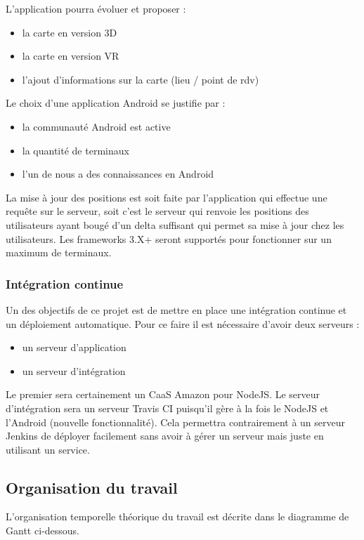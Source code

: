 L'application pourra évoluer et proposer :
\begin{itemize}
    \item la carte en version 3D
    \item la carte en version VR
    \item l'ajout d'informations sur la carte (lieu / point de rdv)
\end{itemize}

Le choix d'une application Android se justifie par :
\begin{itemize}
    \item la communauté Android est active
    \item la quantité de terminaux
    \item l'un de nous a des connaissances en Android
\end{itemize}
La mise à jour des positions est soit faite par l'application qui effectue une requête sur le serveur, soit c'est le serveur qui renvoie les positions des utilisateurs ayant bougé d'un delta suffisant qui permet sa mise à jour chez les utilisateurs. Les frameworks 3.X+ seront supportés pour fonctionner sur un maximum de terminaux.


\subsubsection{Intégration continue}
Un des objectifs de ce projet est de mettre en place une intégration continue et un déploiement automatique. Pour ce faire il est nécessaire d'avoir deux serveurs :
\begin{itemize}
    \item un serveur d'application
    \item un serveur d'intégration
\end{itemize}

Le premier sera certainement un CaaS Amazon pour NodeJS. Le serveur d'intégration sera un serveur Travis CI puisqu'il gère à la fois le NodeJS et l'Android (nouvelle fonctionnalité). Cela permettra contrairement à un serveur Jenkins de déployer facilement sans avoir à gérer un serveur mais juste en utilisant un service.

\subsection{Organisation du travail}

L'organisation temporelle théorique du travail est décrite dans le diagramme de Gantt ci-dessous.

